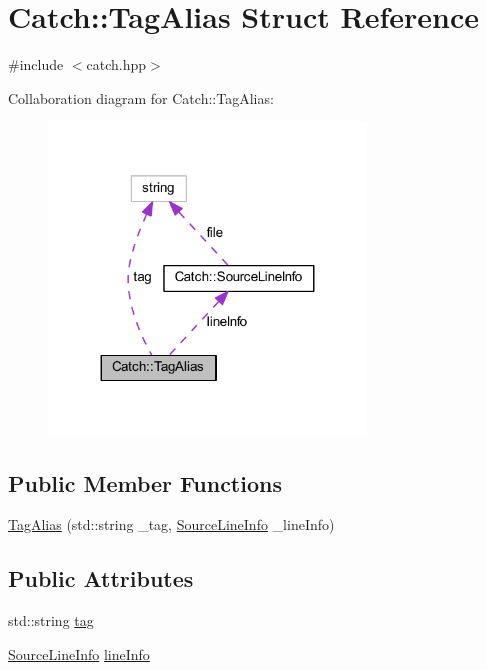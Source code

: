 \hypertarget{struct_catch_1_1_tag_alias}{}\section{Catch\+:\+:Tag\+Alias Struct Reference}
\label{struct_catch_1_1_tag_alias}


{\ttfamily \#include $<$catch.\+hpp$>$}



Collaboration diagram for Catch\+:\+:Tag\+Alias\+:\nopagebreak
\begin{figure}[H]
\begin{center}
\leavevmode
\includegraphics[width=239pt]{struct_catch_1_1_tag_alias__coll__graph}
\end{center}
\end{figure}
\subsection*{Public Member Functions}
\begin{DoxyCompactItemize}
\item 
\hyperlink{struct_catch_1_1_tag_alias_ad9124d03bfb6f767f1c97572330b05bc}{Tag\+Alias} (std\+::string \+\_\+tag, \hyperlink{struct_catch_1_1_source_line_info}{Source\+Line\+Info} \+\_\+line\+Info)
\end{DoxyCompactItemize}
\subsection*{Public Attributes}
\begin{DoxyCompactItemize}
\item 
std\+::string \hyperlink{struct_catch_1_1_tag_alias_a950183883ab17c90d0fab16b966b6e2d}{tag}
\item 
\hyperlink{struct_catch_1_1_source_line_info}{Source\+Line\+Info} \hyperlink{struct_catch_1_1_tag_alias_a2f51fe0b3c052561275d26b6eb88f702}{line\+Info}
\end{DoxyCompactItemize}


